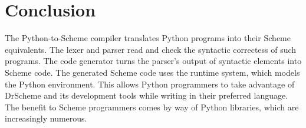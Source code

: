 \section{Conclusion}
\label{conclusion}

The Python-to-Scheme compiler translates Python programs into their Scheme equivalents.  The lexer and parser read and check the syntactic correctess of such programs.  The code generator turns the parser's output of syntactic elements into Scheme code.  The generated Scheme code uses the runtime system, which models the Python environment.  This allows Python programmers to take advantage of DrScheme and its development tools while writing in their preferred language.  The benefit to Scheme programmers comes by way of Python libraries, which are increasingly numerous.
